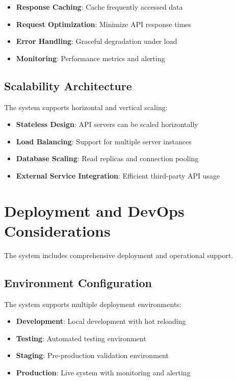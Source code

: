 \begin{itemize}
    \item \textbf{Response Caching}: Cache frequently accessed data
    \item \textbf{Request Optimization}: Minimize API response times
    \item \textbf{Error Handling}: Graceful degradation under load
    \item \textbf{Monitoring}: Performance metrics and alerting
\end{itemize}

\subsection{Scalability Architecture}

The system supports horizontal and vertical scaling:

\begin{itemize}
    \item \textbf{Stateless Design}: API servers can be scaled horizontally
    \item \textbf{Load Balancing}: Support for multiple server instances
    \item \textbf{Database Scaling}: Read replicas and connection pooling
    \item \textbf{External Service Integration}: Efficient third-party API usage
\end{itemize}

\section{Deployment and DevOps Considerations}

The system includes comprehensive deployment and operational support.

\subsection{Environment Configuration}

The system supports multiple deployment environments:

\begin{itemize}
    \item \textbf{Development}: Local development with hot reloading
    \item \textbf{Testing}: Automated testing environment
    \item \textbf{Staging}: Pre-production validation environment
    \item \textbf{Production}: Live system with monitoring and alerting
\end{itemize}

